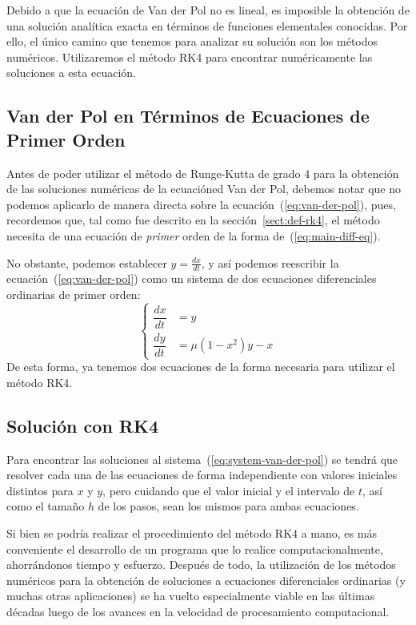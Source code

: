 Debido a que la ecuación de Van der Pol no es lineal, es imposible la obtención de una solución analítica exacta en términos de funciones elementales conocidas. Por ello, el único camino que tenemos para analizar su solución son los métodos numéricos. Utilizaremos el método RK4 para encontrar numéricamente las soluciones a esta ecuación.

\subsection{Van der Pol en Términos de Ecuaciones de Primer Orden}

Antes de poder utilizar el método de Runge-Kutta de grado 4 para la obtención de las soluciones numéricas de la ecuacióned Van der Pol, debemos notar que no podemos aplicarlo de manera directa sobre la ecuación~(\ref{eq:van-der-pol}), pues, recordemos que, tal como fue descrito en la sección~\ref{sect:def-rk4}, el método necesita de una ecuación de \textit{primer} orden de la forma de~(\ref{eq:main-diff-eq}).

No obstante, podemos establecer \(y = \frac{dx}{dt}\), y así podemos reescribir la ecuación~(\ref{eq:van-der-pol}) como un sistema de dos ecuaciones diferenciales ordinarias de primer orden:
\begin{equation} \label{eq:system-van-der-pol}
	\begin{cases}
		\dfrac{dx}{dt} &= y \\[1em]
		\dfrac{dy}{dt} &= \mu(1 - x^{2})y - x
	\end{cases}
\end{equation}
De esta forma, ya tenemos dos ecuaciones de la forma necesaria para utilizar el método RK4.

\subsection{Solución con RK4}

Para encontrar las soluciones al sistema~(\ref{eq:system-van-der-pol}) se tendrá que resolver cada una de las ecuaciones de forma independiente con valores iniciales distintos para \(x\) y \(y\), pero cuidando que el valor inicial y el intervalo de \(t\), así como el tamaño \(h\) de los pasos, sean los mismos para ambas ecuaciones.

Si bien se podría realizar el procedimiento del método RK4 a mano, es más conveniente el desarrollo de un programa que lo realice computacionalmente, ahorrándonos tiempo y esfuerzo. Después de todo, la utilización de los métodos numéricos para la obtención de soluciones a ecuaciones diferenciales ordinarias (y muchas otras aplicaciones) se ha vuelto especialmente viable en las últimas décadas luego de los avances en la velocidad de procesamiento computacional.

